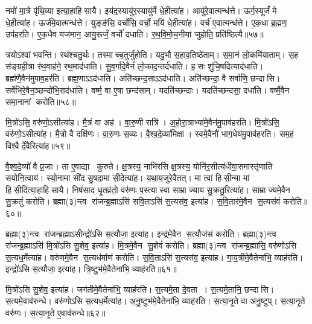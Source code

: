 नमो॑ मा॒त्रे पृ॑थि॒व्या इत्या॒हाहिसायै।
इय॑द॒स्यायु॑र॒स्यायु॑र्मे धे॒हीत्या॑ह।
आयु॑रे॒वात्मन्ध॑त्ते।
ऊर्ग॒स्यूर्जं॑ मे धे॒हीत्या॑ह।
ऊर्ज॑मे॒वात्मन्ध॑त्ते।
युङ्ङ॑सि॒ वर्चो॑सि॒ वर्चो॒ मयि॑ धे॒हीत्या॑ह।
वर्च॑ ए॒वात्मन्ध॑त्ते।
ए॒क॒धा ब्र॒ह्मण॒ उप॑हरति।
ए॒क॒धैव यज॑मान॒ आयु॒रूर्जं॒ वर्चो॑ दधाति।
र॒थ॒वि॒मो॒च॒नीया॑ जुहोति॒ प्रति॑ष्ठित्यै॥५७॥

त्रयोऽश्वा॑ भवन्ति।
रथ॑श्चतु॒र्थः।
तस्माच्च॒तुर्जु॑होति।
यदु॒भौ स॒हाव॒तिष्ठे॑ताम्।
स॒मा॒नं लो॒कमि॑याताम्।
स॒ह स॑ङ्ग्रही॒त्रा र॑थ॒वाह॑ने॒ रथ॒माद॑धाति।
सु॒व॒र्गादे॒वैनं॑ लो॒काद॒न्तर्द॑धाति।
ह॒सः शु॑चि॒षदित्याद॑धाति।
ब्रह्म॑णै॒वैन॑मुपाव॒हर॑ति।
ब्रह्म॒णाऽऽद॑धाति।
अति॑च्छन्द॒साऽऽद॑धाति।
अति॑च्छन्दा॒ वै सर्वा॑णि॒ छन्दासि।
सर्वे॑भिरे॒वैन॒ञ्छन्दो॑भि॒राद॑धाति।
वर्ष्म॒ वा ए॒षा छन्द॑साम्।
यदति॑च्छन्दाः।
यदति॑च्छन्दसा॒ दधा॑ति।
वर्ष्मै॒वैन समा॒नानां करोति॥५८॥\anuvakamend[प॒द्य॒न्ते॒ द॒धा॒ति॒ वी॒र्ये॑णेत्या॒हानात्यै॒ प्रति॑ष्ठित्यै॒ ब्रह्म॒णाऽऽद॑धाति स॒प्त च॑]

मि॒त्रो॑ऽसि॒ वरु॑णो॒ऽसीत्या॑ह।
मै॒त्रं वा अह॑।
वा॒रु॒णी रात्रि॑।
अ॒हो॒रा॒त्राभ्या॑मे॒वैन॑मु॒पाव॑हरति।
मि॒त्रो॑ऽसि॒ वरु॑णो॒ऽसीत्या॑ह।
मै॒त्रो वै दक्षि॑णः।
वा॒रु॒णः स॒व्यः।
वै॒श्व॒दे॒व्या॑मिक्षा।
स्वमे॒वैनौ॑ भाग॒धेय॑मु॒पाव॑हरति।
सम॒हं विश्वैर्दे॒वैरित्या॑ह॥५९॥

वै॒श्व॒दे॒व्यो॑ वै प्र॒जाः।
ता ए॒वाद्या कुरुते।
क्ष॒त्रस्य॒ नाभि॑रसि क्ष॒त्रस्य॒ योनि॑र॒सीत्य॑धीवा॒समास्तृ॑णाति सयोनि॒त्वाय॑।
स्यो॒नामा सी॑द सु॒षदा॒मा सी॒देत्या॑ह।
य॒था॒य॒जुरे॒वैतत्।
मा त्वा॑ हिसी॒न्मा मा॑ हिसी॒दित्या॒हाहिसायै।
निष॑साद धृ॒तव्र॑तो॒ वरु॑णः प॒स्त्यास्वा साम्राज्याय सु॒क्रतु॒रित्या॑ह।
साम्राज्यमे॒वैन सु॒क्रतुं॑ करोति।
ब्रह्मा(३)न्त्व रा॑जन्ब्र॒ह्माऽसि॑ सवि॒ताऽसि॑ स॒त्यस॑व॒ इत्या॑ह।
स॒वि॒तार॑मे॒वैन स॒त्यस॑वं करोति॥६०॥

ब्रह्मा(३)न्त्व रा॑जन्ब्र॒ह्माऽसीन्द्रो॑ऽसि स॒त्यौजा॒ इत्या॑ह।
इन्द्र॑मे॒वैन स॒त्यौज॑सं करोति।
ब्रह्मा(३)न्त्व रा॑जन्ब्र॒ह्माऽसि॑ मि॒त्रो॑ऽसि सु॒शेव॒ इत्या॑ह।
मि॒त्रमे॒वैन सु॒शेवं॑ करोति।
ब्रह्मा(३)न्त्व रा॑जन्ब्र॒ह्मासि॒ वरु॑णोऽसि स॒त्यध॒र्मेत्या॑ह।
वरु॑णमे॒वैन स॒त्यध॑र्माणं करोति।
स॒वि॒ताऽसि॑ स॒त्यस॑व॒ इत्या॑ह।
गा॒य॒त्रीमे॒वैतेना॑भि॒ व्याह॑रति।
इन्द्रो॑ऽसि स॒त्यौजा॒ इत्या॑ह।
त्रि॒ष्टुभ॑मे॒वैतेना॑भि॒ व्याह॑रति॥६१॥

मि॒त्रो॑ऽसि सु॒शेव॒ इत्या॑ह।
जग॑तीमे॒वैतेना॑भि॒ व्याह॑रति।
स॒त्यमे॒ता दे॒वता।
स॒त्यमे॒तानि॒ छन्दासि।
स॒त्यमे॒वाव॑रुन्धे।
वरु॑णोऽसि स॒त्यध॒र्मेत्या॑ह।
अ॒नु॒ष्टुभ॑मे॒वैतेना॑भि॒ व्याह॑रति।
स॒त्या॒नृ॒ते वा अ॑नु॒ष्टुप्।
स॒त्या॒नृ॒ते वरु॑णः।
स॒त्या॒नृ॒ते ए॒वाव॑रुन्धे॥६२॥

